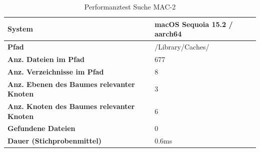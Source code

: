 \documentclass[a4paper,12pt]{report}
\begin{document}
    \begin{table}[h!]
        \centering
        \setlength{\leftmargini}{0.8cm}
        \begin{tabular}{|p{7cm}|p{5cm}|}
            \hline
            \textbf{System}                                            & macOS Sequoia 15.2 / aarch64 \\ \hline
            \textbf{Pfad}                                              & /Library/Caches/             \\ \hline
            \textbf{Anz. Dateien im Pfad}                              & 677                          \\ \hline
            \textbf{Anz. Verzeichnisse im Pfad}                        & 8                            \\ \hline
            \textbf{Anz. Ebenen \newline des Baumes relevanter Knoten} & 3                            \\ \hline
            \textbf{Anz. Knoten \newline des Baumes relevanter Knoten} & 6                            \\ \hline
            \textbf{Gefundene Dateien}                                 & 0                            \\ \hline
            \textbf{Dauer (Stichprobenmittel)}                         & 0.6ms                        \\ \hline
        \end{tabular}
        \caption{Performanztest Suche MAC-2}\label{tab:perf-search-mac-2}
    \end{table}
\end{document}
